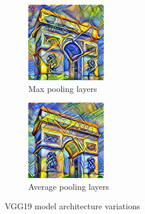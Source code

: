 \documentclass[twocolumn,superscriptaddress,aps, floatfix]{revtex4-1}
\begin{document}
    \begin{figure}[ht]
        \centering
        \begin{subfigure}[b]{0.22\textwidth}
            \centering
            \includegraphics[width=\textwidth]{resources/png/architecture/sun-trees-paris-maxpool.png}
            \caption{Max pooling layers}
        \end{subfigure}
        \hfill
        \begin{subfigure}[b]{0.22\textwidth}
            \centering
            \includegraphics[width=\textwidth]{resources/png/architecture/sun-trees-paris-avgpool.png}
            \caption{Average pooling layers}
        \end{subfigure}
        \caption{VGG19 model architecture variations}
        \label{fig:model.architecture.variations}
    \end{figure}
    
\end{document}
